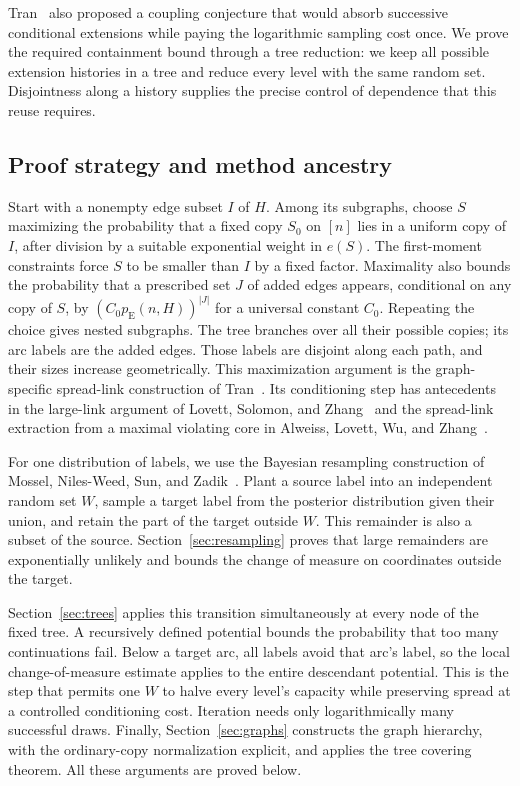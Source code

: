 \documentclass[11pt]{article}
\numberwithin{equation}{section}
\newcommand{\pE}{p_{\mathrm E}}
\begin{document}
Tran~\cite[Section~4]{Tran26} also proposed a coupling conjecture
that would absorb successive conditional extensions while paying the
logarithmic sampling cost once. We prove the required containment
bound through a tree reduction: we keep all possible extension histories
in a tree and reduce every level with the same random set. Disjointness along a
history supplies the precise control of dependence that this reuse
requires.

\subsection{Proof strategy and method ancestry}

Start with a nonempty edge subset $I$ of $H$. Among its subgraphs,
choose $S$ maximizing the probability that a fixed copy $S_0$ on
$[n]$ lies in a uniform copy of $I$, after division by a suitable
exponential weight in $e(S)$.
The first-moment constraints force $S$ to be smaller than $I$ by
a fixed factor. Maximality also bounds the probability that a prescribed
set $J$ of added edges appears, conditional on any copy of $S$, by
$(C_0\pE(n,H))^{|J|}$ for a universal constant $C_0$.
Repeating the choice gives nested subgraphs.
The tree branches over all their possible copies; its arc labels
are the added edges. Those labels are disjoint along each path,
and their sizes increase geometrically. This maximization argument
is the graph-specific spread-link construction of Tran~\cite[Section~3]{Tran26}.
Its conditioning step has antecedents in the large-link argument of
Lovett, Solomon, and Zhang~\cite[Claim~29]{LSZ19} and the spread-link
extraction from a maximal violating core in
Alweiss, Lovett, Wu, and Zhang~\cite[Lemma~2.4]{ALWZ21}.

For one distribution of labels, we use the Bayesian resampling
construction of Mossel, Niles-Weed, Sun, and Zadik~\cite{MNSZ25}.
Plant a source label into an independent random set $W$, sample a
target label from the posterior distribution given their union, and
retain the part of the target outside $W$. This remainder is also a
subset of the source. Section~\ref{sec:resampling} proves that large
remainders are exponentially unlikely and bounds the change of
measure on coordinates outside the target.

Section~\ref{sec:trees} applies this transition simultaneously at
every node of the fixed tree. A recursively defined potential bounds
the probability that too many continuations fail. Below a target
arc, all labels avoid that arc's label, so the local change-of-measure
estimate applies to the entire descendant potential. This is the
step that permits one $W$ to halve every level's capacity while
preserving spread at a controlled conditioning cost. Iteration needs
only logarithmically many successful draws. Finally,
Section~\ref{sec:graphs} constructs the graph hierarchy, with the
ordinary-copy normalization explicit, and applies the tree covering
theorem. All these arguments are proved below.
\end{document}
